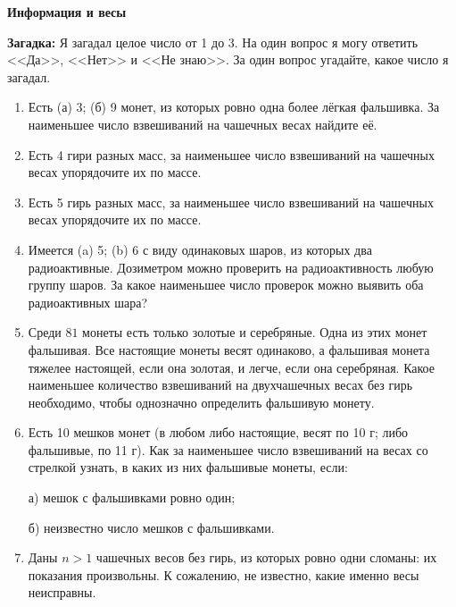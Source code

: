 \documentclass{article}
\begin{document}
\large
	
	
\begin{center}
	\textbf{Информация и весы}
\end{center}

\textbf{Загадка:} Я загадал целое число от 1 до 3. На один вопрос я могу ответить <<Да>>, <<Нет>> и <<Не знаю>>. За один вопрос угадайте, какое число я загадал.


\begin{enumerate}[label*=\protect\fbox{\arabic{enumi}}]

\item Есть (а) 3; (б) 9 монет, из которых ровно одна более лёгкая фальшивка. За наименьшее число взвешиваний на чашечных весах найдите её.


\item Есть 4 гири разных масс, за наименьшее число взвешиваний на чашечных весах упорядочите их по массе.

\item Есть 5 гирь разных масс, за наименьшее число взвешиваний на чашечных весах упорядочите их по массе.

\item Имеется (a) 5; (b) 6 с виду одинаковых шаров, из которых два радиоактивные. Дозиметром можно проверить на радиоактивность любую группу шаров. За какое наименьшее число проверок можно выявить оба радиоактивных шара?

\item Среди $81$ монеты есть только золотые и серебряные. Одна из этих монет фальшивая. Все настоящие монеты весят одинаково, а фальшивая монета тяжелее настоящей, если она золотая, и легче, если она серебряная. Какое наименьшее количество взвешиваний на двухчашечных весах без гирь необходимо, чтобы однозначно определить фальшивую монету.

\item Есть 10 мешков монет (в любом либо настоящие, весят по 10 г; либо фальшивые, по 11 г). Как за наименьшее число взвешиваний на весах со стрелкой узнать, в каких из них фальшивые монеты, если:

а) мешок с фальшивками ровно один;

б) неизвестно число мешков с фальшивками.

\item Даны $n > 1$ чашечных весов без гирь, из которых ровно одни сломаны: их показания произвольны. К сожалению, не известно, какие именно весы неисправны.


\end{enumerate}
\end{document}
